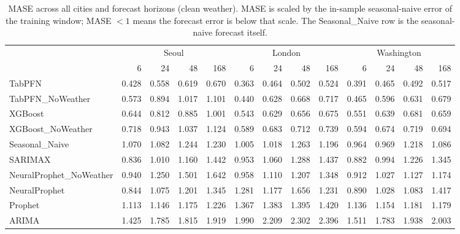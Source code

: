 \begin{table}[ht!]
\centering
\caption{MASE across all cities and forecast horizons (clean weather). MASE is scaled by the in-sample seasonal-naive error of the training window; MASE $< 1$ means the forecast error is below that scale. The Seasonal\_Naive row is the seasonal-naive forecast itself.}
\label{tab:mase_cross_city}
{\small\setlength{\tabcolsep}{3pt}\scriptsize
\begin{tabular}{lrrrrrrrrrrrr}
\toprule
 & \multicolumn{4}{c}{Seoul} & \multicolumn{4}{c}{London} & \multicolumn{4}{c}{Washington} \\
 & 6 & 24 & 48 & 168 & 6 & 24 & 48 & 168 & 6 & 24 & 48 & 168 \\
\midrule
TabPFN & 0.428 & 0.558 & 0.619 & 0.670 & 0.363 & 0.464 & 0.502 & 0.524 & 0.391 & 0.465 & 0.492 & 0.517 \\
TabPFN\_NoWeather & 0.573 & 0.894 & 1.017 & 1.101 & 0.440 & 0.628 & 0.668 & 0.717 & 0.465 & 0.596 & 0.631 & 0.679 \\
XGBoost & 0.644 & 0.812 & 0.885 & 1.001 & 0.543 & 0.629 & 0.656 & 0.675 & 0.551 & 0.639 & 0.681 & 0.659 \\
XGBoost\_NoWeather & 0.718 & 0.943 & 1.037 & 1.124 & 0.589 & 0.683 & 0.712 & 0.739 & 0.594 & 0.674 & 0.719 & 0.694 \\
Seasonal\_Naive & 1.070 & 1.082 & 1.244 & 1.230 & 1.005 & 1.018 & 1.263 & 1.196 & 0.964 & 0.969 & 1.218 & 1.086 \\
SARIMAX & 0.836 & 1.010 & 1.160 & 1.442 & 0.953 & 1.060 & 1.288 & 1.437 & 0.882 & 0.994 & 1.226 & 1.345 \\
NeuralProphet\_NoWeather & 0.940 & 1.250 & 1.501 & 1.642 & 0.958 & 1.110 & 1.207 & 1.348 & 0.912 & 1.027 & 1.127 & 1.174 \\
NeuralProphet & 0.844 & 1.075 & 1.201 & 1.345 & 1.281 & 1.177 & 1.656 & 1.231 & 0.890 & 1.028 & 1.083 & 1.417 \\
Prophet & 1.113 & 1.146 & 1.175 & 1.226 & 1.367 & 1.383 & 1.395 & 1.420 & 1.136 & 1.154 & 1.181 & 1.179 \\
ARIMA & 1.425 & 1.785 & 1.815 & 1.919 & 1.990 & 2.209 & 2.302 & 2.396 & 1.511 & 1.783 & 1.938 & 2.003 \\
\bottomrule
\end{tabular}
}
\end{table}
